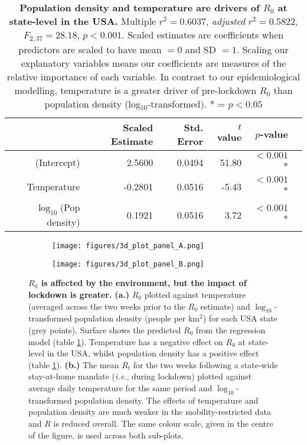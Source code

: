 \documentclass[12pt,english,a4paper]{article}
\newcommand{\RO}{$R_0$\xspace}
\begin{document}
\begin{table}[ht]
\centering
\caption{\textbf{Population density and temperature are drivers of \RO at state-level in the USA.} Multiple $r^2 = 0.6037$, \textsl{adjusted} $r^2 = 0.5822$, $F_{2,37} = 28.18$, $p < 0.001$. Scaled estimates are coefficients when predictors are scaled to have mean $= 0$ and SD $= 1$. Scaling our explanatory variables means our coefficients are measures of the relative importance of each variable. In contrast to our epidemiological modelling, temperature is a greater driver of pre-lockdown \RO than population density (log$_{10}$-transformed). * = $p < 0.05$}
\begin{tabular}{rrrrrr}
  \hline
 & Scaled Estimate & Std. Error &  $t$ value & $p$-value \\ 
  \hline
  (Intercept) & 2.5600 & 0.0494 & 51.80 & $<0.001$* \\ 
  Temperature & -0.2801 & 0.0516 & -5.43 & $<0.001$* \\ 
  $\log_{10}$(Pop density) & 0.1921 & 0.0516 & 3.72 & $<0.001$*  \\ 
   \hline
\end{tabular}
\label{tab:regression}
\end{table}



\begin{figure}[ht]
\begin{subfigure}{.5\textwidth}
  \centering
  \texttt{[image: figures/3d\_plot\_panel\_A.png]}  
  \caption{}
\end{subfigure}
\begin{subfigure}{.5\textwidth}
  \centering
  \texttt{[image: figures/3d\_plot\_panel\_B.png]}  
  \caption{}
\end{subfigure}
\caption{{\bf \RO is affected by the environment, but the impact of lockdown is greater.} {\bf (a.)} \RO plotted against temperature (averaged across the two weeks prior to the \RO estimate) and $\log_{10}$-transformed population density (people per km$^2$) for each USA state (grey points). Surface shows the predicted \RO from the regression model (table \ref{tab:regression}). Temperature has a negative effect on \RO at state-level in the USA, whilst population density has a positive effect (table \ref{tab:regression}). {\bf (b.)} The mean $R_t$ for the two weeks following a state-wide stay-at-home mandate (\emph{i.e.}, during lockdown) plotted against average daily temperature for the same period and $\log_{10}$-transformed population density. The effects of temperature and population density are much weaker in the mobility-restricted data and $R$ is reduced overall. The same colour scale, given in the centre of the figure, is used across both sub-plots.}
\label{fig:R0_Rt_plots}
\end{figure}
\end{document}
